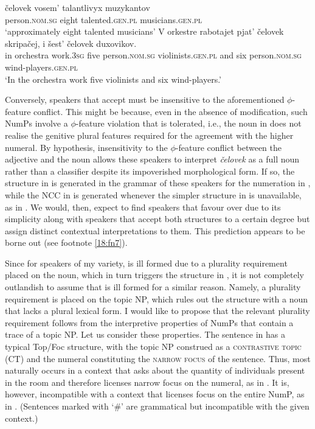 \documentclass[output=paper,
modfonts,
newtxmath,
hidelinks
]{langscibook}
\begin{document}
{\ea \label{18:fn17i}
\gll čelovek      vosem’  talantlivyx  muzykantov \\  
	 person.\textsc{nom.sg} eight  talented.\textsc{gen.pl}  musicians.\textsc{gen.pl} \\
\glt `approximately eight talented musicians'  
\z
\ea\label{18:fn17ii}
\gll V orkestre rabotajet pjat’ čelovek skripačej, i šest’ čelovek duxovikov. \\
	 in orchestra work.\textsc{3sg} five person.\textsc{nom.sg} violinists.\textsc{gen.pl} and six person.\textsc{nom.sg} wind-players.\textsc{gen.pl} \\
\glt `In the orchestra work five violinists and six wind-players.'
\zlast
}

Conversely, speakers that accept  must be insensitive to the aforementioned ${\phi}${}-feature conflict. This might be because, even in the absence of modification, such NumPs involve a ${\phi}${}-feature violation that is tolerated, i.e., the noun in  does not realise the genitive plural features required for the agreement with the higher numeral. By hypothesis, insensitivity to the ${\phi}${}-feature conflict between the adjective and the noun allows these speakers to interpret \textit{čelovek} as a full noun rather than a classifier despite its impoverished morphological form. If so, the structure in  is generated in the grammar of these speakers for the numeration in , while the NCC in  is generated whenever the simpler structure in  is unavailable, as in . We would, then, expect to find speakers that favour  over  due to its simplicity along with speakers that accept both structures to a certain degree but assign distinct contextual interpretations to them. This prediction appears to be borne out (see footnote \ref{18:fn7}).

\largerpage[2]
Since for speakers of my variety,  is ill formed due to a plurality requirement placed on the noun, which in turn triggers the structure in , it is not completely outlandish to assume that  is ill formed for a similar reason. Namely, a plurality requirement is placed on the topic NP, which rules out the structure with a noun that lacks a plural lexical form. I would like to propose that the relevant plurality requirement follows from the interpretive properties of NumPs that contain a trace of a topic NP. Let us consider these properties. The sentence in  has a typical Top/Foc structure, with the topic NP construed as a \textsc{contrastive topic} (CT) and the numeral constituting the \textsc{narrow focus} of the sentence. Thus,  most naturally occurs in a context that asks about the quantity of individuals present in the room and therefore licenses narrow focus on the numeral, as in . It is, however, incompatible with a context that licenses focus on the entire NumP, as in . (Sentences marked with ‘\#’ are grammatical but incompatible with the given context.)
\end{document}
